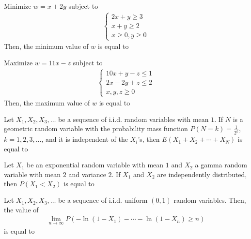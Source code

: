 \documentclass[journal]{IEEEtran}
\numberwithin{equation}{enumi}
\numberwithin{figure}{enumi}
\begin{document}
\begin{enumerate}
{\hfill{}

\item Minimize $w = x + 2y$ subject to
\begin{align*}
\begin{cases}
2x + y \geq 3 \\
x + y \geq 2 \\
x \geq 0, y \geq 0
\end{cases}
\end{align*}
Then, the minimum value of $w$ is equal to \underline

\hfill{}

\item Maximize $w = 11x - z$ subject to
\begin{align*}
\begin{cases}
10x + y - z \leq 1 \\
2x - 2y + z \leq 2 \\
x, y, z \geq 0
\end{cases}
\end{align*}
Then, the maximum value of $w$ is equal to \underline

\hfill{}

\item Let $X_1, X_2, X_3, \ldots$ be a sequence of i.i.d. random variables with mean $1$. If $N$ is a geometric random variable with the probability mass function $P(N = k) = \frac{1}{2^k}$, $k = 1, 2, 3, \ldots$, and it is independent of the $X_i$'s, then $E(X_1 + X_2 + \cdots + X_N)$ is equal to \underline

\hfill{}

\item Let $X_1$ be an exponential random variable with mean $1$ and $X_2$ a gamma random variable with mean $2$ and variance $2$. If $X_1$ and $X_2$ are independently distributed, then $P(X_1 < X_2)$ is equal to \underline

\hfill{}

\item Let $X_1, X_2, X_3, \ldots$ be a sequence of i.i.d. uniform $(0,1)$ random variables. Then, the value of
\begin{align*}
\lim_{n \to \infty} P\left( -\ln(1 - X_1) - \cdots - \ln(1 - X_n) \geq n \right)
\end{align*}
is equal to \underline

\hfill{}

}
\end{enumerate}
\end{document}
